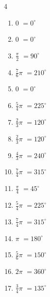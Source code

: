\begin{multicols}{4}
\begin{enumerate}
  \item $\displaystyle 0$
        $\displaystyle =0^{\circ}$

  \item $\displaystyle 0$
        $\displaystyle =0^{\circ}$

  \item $\displaystyle \frac{\pi}{2}$
        $\displaystyle =90^{\circ}$

  \item $\displaystyle \frac{7}{6}\pi$
        $\displaystyle =210^{\circ}$

  \item $\displaystyle 0$
        $\displaystyle =0^{\circ}$

  \item $\displaystyle \frac{5}{4}\pi$
        $\displaystyle =225^{\circ}$

  \item $\displaystyle \frac{2}{3}\pi$
        $\displaystyle =120^{\circ}$

\columnbreak %

  \item $\displaystyle \frac{2}{3}\pi$
        $\displaystyle =120^{\circ}$

  \item $\displaystyle \frac{4}{3}\pi$
        $\displaystyle =240^{\circ}$

  \item $\displaystyle \frac{7}{4}\pi$
        $\displaystyle =315^{\circ}$

  \item $\displaystyle \frac{\pi}{4}$
        $\displaystyle =45^{\circ}$

  \item $\displaystyle \frac{5}{4}\pi$
        $\displaystyle =225^{\circ}$

  \item $\displaystyle \frac{7}{4}\pi$
        $\displaystyle =315^{\circ}$

  \item $\displaystyle \pi$
        $\displaystyle =180^{\circ}$

  \item $\displaystyle \frac{5}{6}\pi$
        $\displaystyle =150^{\circ}$

  \item $\displaystyle 2\pi$
        $\displaystyle =360^{\circ}$

  \item $\displaystyle \frac{3}{4}\pi$
        $\displaystyle =135^{\circ}$


\end{enumerate}
\end{multicols}

